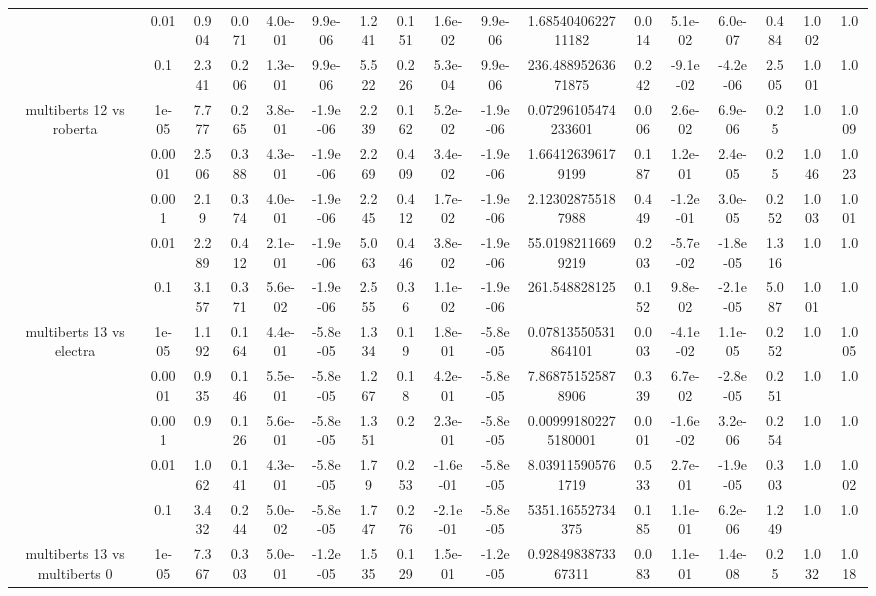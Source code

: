 \begin{tabular}{|c|c|c|c|c|c|c|c|c|c|c|c|c|c|c|c|c|}
 & 0.01 & 0.904 & 0.071 & 4.0e-01 & 9.9e-06 & 1.241 & 0.151 & 1.6e-02 & 9.9e-06 & 1.6854040622711182 & 0.014 & 5.1e-02 & 6.0e-07 & 0.484 & 1.002 & 1.0 \\
 & 0.1 & 2.341 & 0.206 & 1.3e-01 & 9.9e-06 & 5.522 & 0.226 & 5.3e-04 & 9.9e-06 & 236.48895263671875 & 0.242 & -9.1e-02 & -4.2e-06 & 2.505 & 1.001 & 1.0 \\
\hline
\multirow{5}{*}{multiberts 12 vs roberta } & 1e-05 & 7.777 & 0.265 & 3.8e-01 & -1.9e-06 & 2.239 & 0.162 & 5.2e-02 & -1.9e-06 & 0.07296105474233601 & 0.006 & 2.6e-02 & 6.9e-06 & 0.25 & 1.0 & 1.009 \\
 & 0.0001 & 2.506 & 0.388 & 4.3e-01 & -1.9e-06 & 2.269 & 0.409 & 3.4e-02 & -1.9e-06 & 1.664126396179199 & 0.187 & 1.2e-01 & 2.4e-05 & 0.25 & 1.046 & 1.023 \\
 & 0.001 & 2.19 & 0.374 & 4.0e-01 & -1.9e-06 & 2.245 & 0.412 & 1.7e-02 & -1.9e-06 & 2.123028755187988 & 0.449 & -1.2e-01 & 3.0e-05 & 0.252 & 1.003 & 1.001 \\
 & 0.01 & 2.289 & 0.412 & 2.1e-01 & -1.9e-06 & 5.063 & 0.446 & 3.8e-02 & -1.9e-06 & 55.01982116699219 & 0.203 & -5.7e-02 & -1.8e-05 & 1.316 & 1.0 & 1.0 \\
 & 0.1 & 3.157 & 0.371 & 5.6e-02 & -1.9e-06 & 2.555 & 0.36 & 1.1e-02 & -1.9e-06 & 261.548828125 & 0.152 & 9.8e-02 & -2.1e-05 & 5.087 & 1.001 & 1.0 \\
\hline
\multirow{5}{*}{multiberts 13 vs electra } & 1e-05 & 1.192 & 0.164 & 4.4e-01 & -5.8e-05 & 1.334 & 0.19 & 1.8e-01 & -5.8e-05 & 0.07813550531864101 & 0.003 & -4.1e-02 & 1.1e-05 & 0.252 & 1.0 & 1.005 \\
 & 0.0001 & 0.935 & 0.146 & 5.5e-01 & -5.8e-05 & 1.267 & 0.18 & 4.2e-01 & -5.8e-05 & 7.868751525878906 & 0.339 & 6.7e-02 & -2.8e-05 & 0.251 & 1.0 & 1.0 \\
 & 0.001 & 0.9 & 0.126 & 5.6e-01 & -5.8e-05 & 1.351 & 0.2 & 2.3e-01 & -5.8e-05 & 0.009991802275180001 & 0.001 & -1.6e-02 & 3.2e-06 & 0.254 & 1.0 & 1.0 \\
 & 0.01 & 1.062 & 0.141 & 4.3e-01 & -5.8e-05 & 1.79 & 0.253 & -1.6e-01 & -5.8e-05 & 8.039115905761719 & 0.533 & 2.7e-01 & -1.9e-05 & 0.303 & 1.0 & 1.002 \\
 & 0.1 & 3.432 & 0.244 & 5.0e-02 & -5.8e-05 & 1.747 & 0.276 & -2.1e-01 & -5.8e-05 & 5351.16552734375 & 0.185 & 1.1e-01 & 6.2e-06 & 1.249 & 1.0 & 1.0 \\
\hline
\multirow{5}{*}{multiberts 13 vs multiberts 0} & 1e-05 & 7.367 & 0.303 & 5.0e-01 & -1.2e-05 & 1.535 & 0.129 & 1.5e-01 & -1.2e-05 & 0.9284983873367311 & 0.083 & 1.1e-01 & 1.4e-08 & 0.25 & 1.032 & 1.018 \\

\end{tabular}
